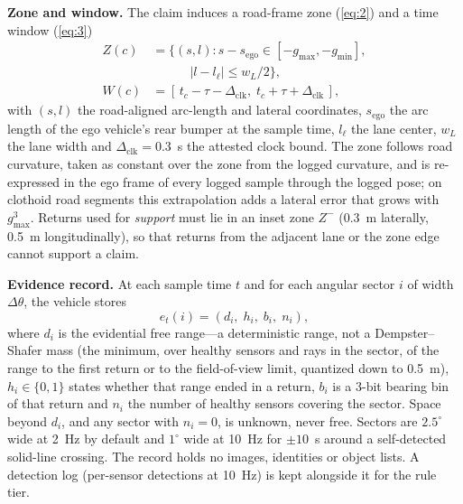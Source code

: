 \textbf{Zone and window.} The claim induces a road-frame zone (\ref{eq:2}) and a time window (\ref{eq:3})
\begin{align}
Z(c) &= \{(s,l) : s - s_{\mathrm{ego}} \in [-g_{\max}, -g_{\min}], \nonumber\\
&\qquad\quad |l - l_\ell| \le w_L/2\}, \label{eq:2}\\
W(c) &= [\,t_c - \tau - \Delta_{\mathrm{clk}},\; t_c + \tau + \Delta_{\mathrm{clk}}\,], \label{eq:3}
\end{align}
with $(s,l)$ the road-aligned arc-length and lateral coordinates, $s_{\mathrm{ego}}$ the arc length of the ego vehicle's rear bumper at the sample time, $l_\ell$ the lane center, $w_L$ the lane width and $\Delta_{\mathrm{clk}} = 0.3$~s the attested clock bound. The zone follows road curvature, taken as constant over the zone from the logged curvature, and is re-expressed in the ego frame of every logged sample through the logged pose; on clothoid road segments this extrapolation adds a lateral error that grows with $g_{\max}^3$. Returns used for \emph{support} must lie in an inset zone $Z^-$ (0.3~m laterally, 0.5~m longitudinally), so that returns from the adjacent lane or the zone edge cannot support a claim.

\textbf{Evidence record.} At each sample time $t$ and for each angular sector $i$ of width $\Delta\theta$, the vehicle stores
\begin{equation}
e_t(i) = (d_i,\; h_i,\; b_i,\; n_i),
\label{eq:4}
\end{equation}
where $d_i$ is the evidential free range---a deterministic range, not a Dempster--Shafer mass (the minimum, over healthy sensors and rays in the sector, of the range to the first return or to the field-of-view limit, quantized down to 0.5~m), $h_i \in \{0,1\}$ states whether that range ended in a return, $b_i$ is a 3-bit bearing bin of that return and $n_i$ the number of healthy sensors covering the sector. Space beyond $d_i$, and any sector with $n_i = 0$, is unknown, never free. Sectors are $2.5^\circ$ wide at 2~Hz by default and $1^\circ$ wide at 10~Hz for $\pm 10$~s around a self-detected solid-line crossing. The record holds no images, identities or object lists. A detection log (per-sensor detections at 10~Hz) is kept alongside it for the rule tier.

